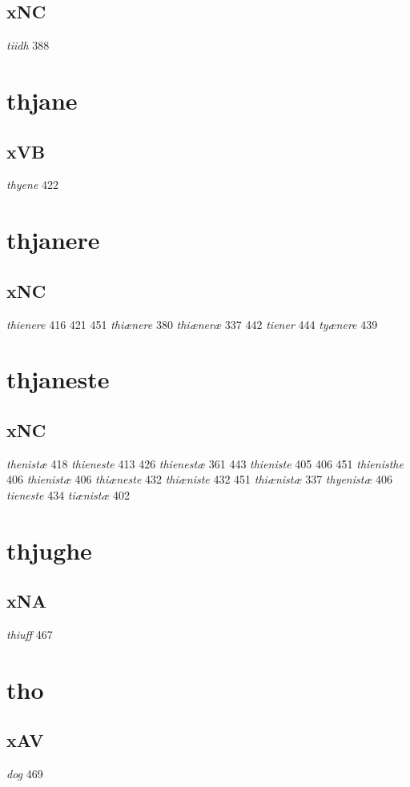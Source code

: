 \documentclass[a4paper,twocolumn]{article}
\begin{document}
\subsection{xNC}
\label{sec:org4fc4dab}
\emph{tiidh} 388 
\section{thjane}
\label{sec:org138621b}
\subsection{xVB}
\label{sec:org9288313}
\emph{thyene} 422 
\section{thjanere}
\label{sec:orgffa1f7e}
\subsection{xNC}
\label{sec:org1ab3bfb}
\emph{thienere} 416 421 451 \emph{thiænere} 380 \emph{thiæneræ} 337 442 \emph{tiener} 444 \emph{tyænere} 439 
\section{thjaneste}
\label{sec:org0b4f95d}
\subsection{xNC}
\label{sec:org7a214dc}
\emph{thenistæ} 418 \emph{thieneste} 413 426 \emph{thienestæ} 361 443 \emph{thieniste} 405 406 451 \emph{thienisthe} 406 \emph{thienistæ} 406 \emph{thiæneste} 432 \emph{thiæniste} 432 451 \emph{thiænistæ} 337 \emph{thyenistæ} 406 \emph{tieneste} 434 \emph{tiænistæ} 402 
\section{thjughe}
\label{sec:orge1e78ab}
\subsection{xNA}
\label{sec:org2964c2f}
\emph{thiuff} 467 
\section{tho}
\label{sec:org3912402}
\subsection{xAV}
\label{sec:org762d176}
\emph{dog} 469 
\end{document}
